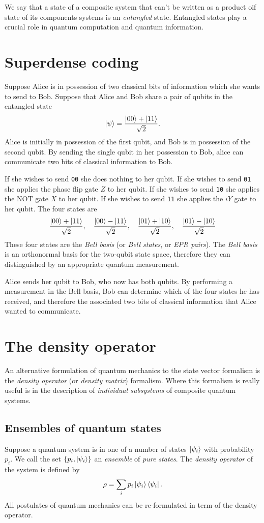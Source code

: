 We say that a state of a composite system that can't be written as a product oif state of its components systems is an \emph{entangled} state.
Entangled states play a crucial role in quantum computation and quantum information.

\section{Superdense coding}
Suppose Alice is in possession of two classical bits of information which she wants to send to Bob.
Suppose that Alice and Bob share a pair of qubits in the entangled state
\[
    \ket{\psi} = \frac{\ket{00} + \ket{11}}{\sqrt{2}}.
\]
Alice is initially in possession of the first qubit, and Bob is in possession of the second qubit.
By sending the single qubit in her possession to Bob, alice can communicate two bits of classical information to Bob.

If she wishes to send \texttt{00} she does nothing to her qubit.
If she wishes to send \texttt{01} she applies the phase flip gate $Z$ to her qubit.
If she wishes to send \texttt{10} she applies the NOT gate $X$ to her qubit.
If she wishes to send \texttt{11} she applies the $iY$ gate to her qubit.
The four states are
\[
    \frac{\ket{00} + \ket{11}}{\sqrt{2}}, \quad \frac{\ket{00} - \ket{11}}{\sqrt{2}}, \quad \frac{\ket{01} + \ket{10}}{\sqrt{2}}, \quad \frac{\ket{01} - \ket{10}}{\sqrt{2}}
\]
These four states are the \emph{Bell basis} (or \emph{Bell states}, or \emph{EPR pairs}).
The \emph{Bell basis} is an orthonormal basis for the two-qubit state space,
therefore they can distinguished by an appropriate quantum measurement.

Alice sends her qubit to Bob, who now has both qubits.
By performing a measurement in the Bell basis, Bob can determine which of the four states he has received,
and therefore the associated two bits of classical information that Alice wanted to communicate.

\section{The density operator}
An alternative formulation of quantum mechanics to the state vector formalism is the \emph{density operator} (or \emph{density matrix}) formalism.
Where this formalism is really useful is in the description of \emph{individual subsystems} of composite quantum systems.

\subsection{Ensembles of quantum states}
Suppose a quantum system is in one of a number of states $\ket{\psi_i}$ with probability $p_i$.
We call the set $\{p_i, \ket{\psi_i}\}$ an \emph{ensemble} of \emph{pure states}.
The \emph{density operator} of the system is defined by
\[
    \rho = \sum_i p_i \ket{\psi_i}\bra{\psi_i}.
\]
All postulates of quantum mechanics can be re-formulated in term of the density operator.

